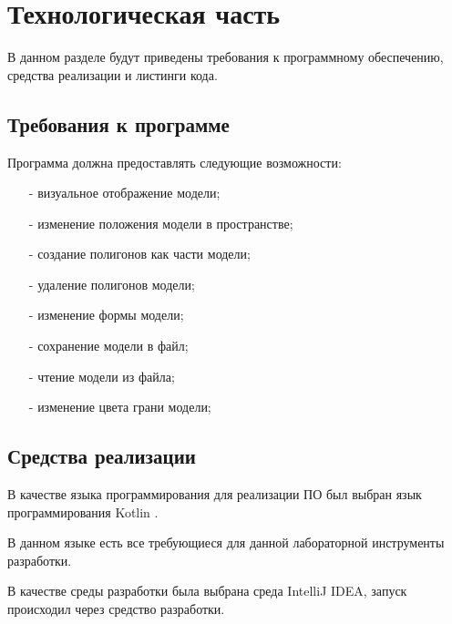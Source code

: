 \chapter{Технологическая часть}

В данном разделе будут приведены требования к программному обеспечению, средства реализации и листинги кода.

\section{Требования к программе}

Программа должна предоставлять следующие возможности:
\begin{itemize}
	\item[-] визуальное отображение модели;
	\item[-] изменение положения модели в пространстве;
	\item[-] создание полигонов как части модели;
	\item[-] удаление полигонов модели;
	\item[-] изменение формы модели;
	\item[-] сохранение модели в файл;
	\item[-] чтение модели из файла;
	\item[-] изменение цвета грани модели;
\end{itemize}

\section{Средства реализации}

В качестве языка программирования для реализации ПО был выбран язык программирования Kotlin \cite{kotlin}. 

В данном языке есть все требующиеся для данной лабораторной инструменты разработки.

В качестве среды разработки была выбрана среда IntelliJ IDEA\cite{idea}, запуск происходил через средство разработки.



